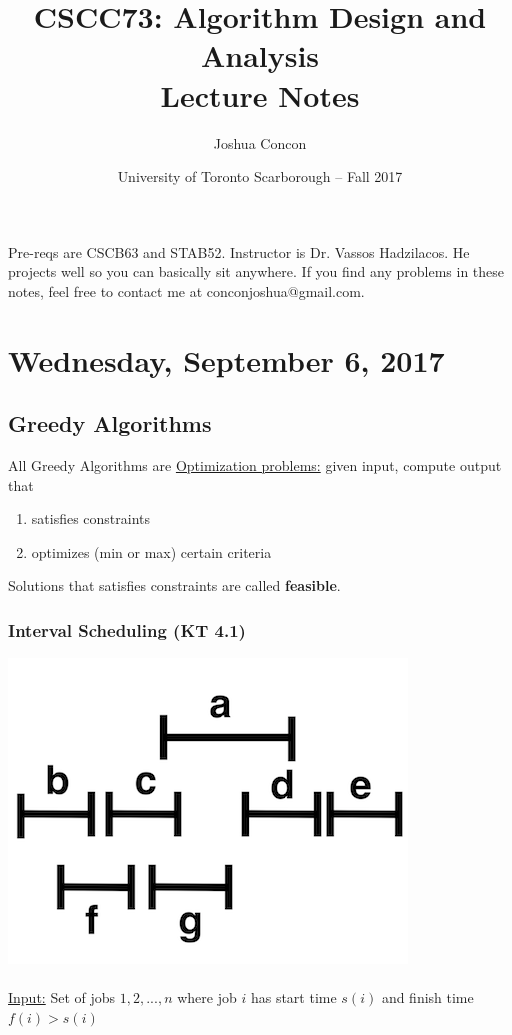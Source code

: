 \documentclass[12pt]{article}
\begin{document}
\title{CSCC73: Algorithm Design and Analysis\\ Lecture Notes}
\date{University of Toronto Scarborough -- Fall 2017}
\author{Joshua Concon}
\maketitle
Pre-reqs are CSCB63 and STAB52.
Instructor is Dr. Vassos Hadzilacos. He projects well so you can basically sit anywhere. If you find any problems in these notes, feel free to contact me at conconjoshua@gmail.com.

\tableofcontents

\pagebreak

\section{Wednesday, September 6, 2017}

\subsection{Greedy Algorithms}

All Greedy Algorithms are \underline{Optimization problems:} given input, compute output that
\begin{enumerate}
	\item{satisfies constraints}
	\item{optimizes (min or max) certain criteria}
\end{enumerate}

Solutions that satisfies constraints are called \textbf{feasible}.

\subsubsection{Interval Scheduling (KT 4.1)}

\includegraphics{interval1}\\
\\
\underline{Input:} Set of jobs $1,2,...,n$ where job $i$ has start time $s(i)$ and finish time $f(i) > s(i)$
\end{document}
